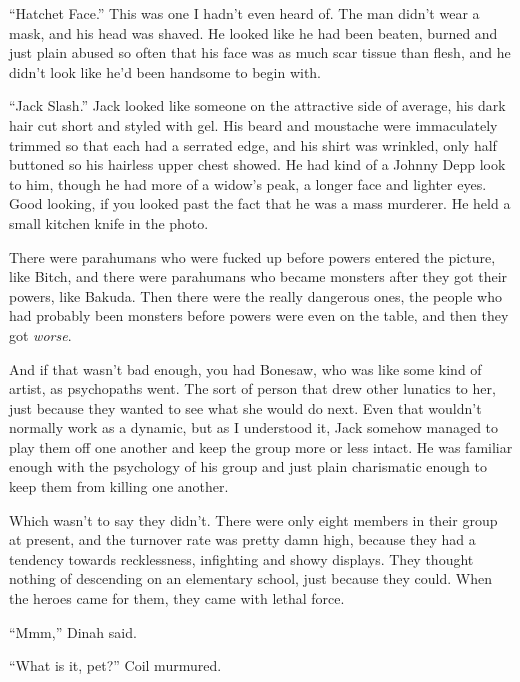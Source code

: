 ``Hatchet Face.''  This was one I hadn't even heard of.  The man didn't wear a mask, and his head was shaved.  He looked like he had been beaten, burned and just plain abused so often that his face was as much scar tissue than flesh, and he didn't look like he'd been handsome to begin with.



``Jack Slash.''  Jack looked like someone on the attractive side of average, his dark hair cut short and styled with gel.  His beard and moustache were immaculately trimmed so that each had a serrated edge, and his shirt was wrinkled, only half buttoned so his hairless upper chest showed.  He had kind of a Johnny Depp look to him, though he had more of a widow's peak, a longer face and lighter eyes.  Good looking, if you looked past the fact that he was a mass murderer.  He held a small kitchen knife in the photo.



There were parahumans who were fucked up before powers entered the picture, like Bitch, and there were parahumans who became monsters after they got their powers, like Bakuda.  Then there were the really dangerous ones, the people who had probably been monsters before powers were even on the table, and then they got \emph{worse}.



And if that wasn't bad enough, you had Bonesaw, who was like some kind of artist, as psychopaths went.  The sort of person that drew other lunatics to her, just because they wanted to see what she would do next.  Even that wouldn't normally work as a dynamic, but as I understood it, Jack somehow managed to play them off one another and keep the group more or less intact.  He was familiar enough with the psychology of his group and just plain charismatic enough to keep them from killing one another.



Which wasn't to say they didn't.  There were only eight members in their group at present, and the turnover rate was pretty damn high, because they had a tendency towards recklessness, infighting and showy displays.  They thought nothing of descending on an elementary school, just because they could.  When the heroes came for them, they came with lethal force.



``Mmm,'' Dinah said.



``What is it, pet?'' Coil murmured.



